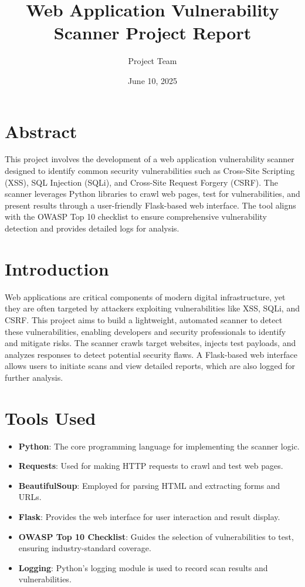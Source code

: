 \documentclass[a4paper,12pt]{article}
\begin{document}
\title{Web Application Vulnerability Scanner Project Report}
\author{Project Team}
\date{June 10, 2025}
\maketitle

\section*{Abstract}
This project involves the development of a web application vulnerability scanner designed to identify common security vulnerabilities such as Cross-Site Scripting (XSS), SQL Injection (SQLi), and Cross-Site Request Forgery (CSRF). The scanner leverages Python libraries to crawl web pages, test for vulnerabilities, and present results through a user-friendly Flask-based web interface. The tool aligns with the OWASP Top 10 checklist to ensure comprehensive vulnerability detection and provides detailed logs for analysis.

\section{Introduction}
Web applications are critical components of modern digital infrastructure, yet they are often targeted by attackers exploiting vulnerabilities like XSS, SQLi, and CSRF. This project aims to build a lightweight, automated scanner to detect these vulnerabilities, enabling developers and security professionals to identify and mitigate risks. The scanner crawls target websites, injects test payloads, and analyzes responses to detect potential security flaws. A Flask-based web interface allows users to initiate scans and view detailed reports, which are also logged for further analysis.

\section{Tools Used}
\begin{itemize}
    \item \textbf{Python}: The core programming language for implementing the scanner logic.
    \item \textbf{Requests}: Used for making HTTP requests to crawl and test web pages.
    \item \textbf{BeautifulSoup}: Employed for parsing HTML and extracting forms and URLs.
    \item \textbf{Flask}: Provides the web interface for user interaction and result display.
    \item \textbf{OWASP Top 10 Checklist}: Guides the selection of vulnerabilities to test, ensuring industry-standard coverage.
    \item \textbf{Logging}: Python's logging module is used to record scan results and vulnerabilities.
\end{itemize}
\end{document}
